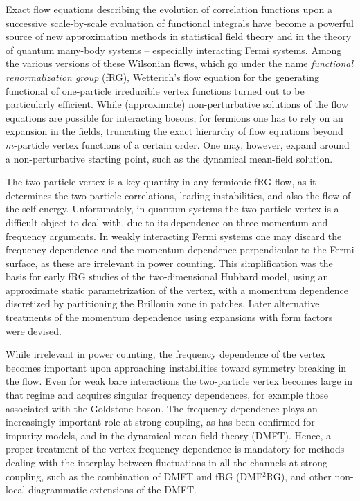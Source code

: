 Exact flow equations describing the evolution of correlation functions upon a successive scale-by-scale evaluation of functional integrals have become a powerful source of new approximation methods in statistical field theory \cite{Berges2002} and in the theory of quantum many-body systems -- especially interacting Fermi systems. \cite{Metzner2012} Among the various versions of these Wilsonian flows, which go under the name {\em functional renormalization group} (fRG), Wetterich's \cite{Wetterich1993} flow equation for the generating functional of one-particle irreducible vertex functions turned out to be particularly efficient. 
While (approximate) non-perturbative solutions of the flow equations are possible for interacting bosons, for fermions one has to rely on an expansion in the fields, truncating the exact hierarchy of flow equations beyond $m$-particle vertex functions of a certain order. One may, however, expand around a non-perturbative starting point, such as the dynamical mean-field solution. \cite{Taranto2014}

The two-particle vertex is a key quantity in any fermionic fRG flow, as it determines the two-particle correlations, leading instabilities, and also the flow of the self-energy. Unfortunately, in quantum systems the two-particle vertex is a difficult object to deal with, due to its dependence on three momentum and frequency arguments. In weakly interacting Fermi systems one may discard the frequency dependence and the momentum dependence perpendicular to the Fermi surface, as these are irrelevant in power counting. This simplification was the basis for early fRG studies of the two-dimensional Hubbard model, using an approximate static parametrization of the vertex, with a momentum dependence discretized by partitioning the Brillouin zone in patches. \cite{Zanchi1996,Halboth2000,Halboth2000b,Honerkamp2001}
Later alternative treatments of the momentum dependence using expansions with form factors were devised.\cite{Husemann2009,Eberlein2013,Eberlein2016}

While irrelevant in power counting, the frequency dependence of the vertex becomes important upon approaching instabilities toward symmetry breaking in the flow.\cite{Husemann2012} Even for weak bare interactions the two-particle vertex becomes large in that regime and acquires singular frequency dependences, for example those associated with the Goldstone boson.\cite{Eberlein2013}
The frequency dependence plays an increasingly important role at strong coupling, as has been confirmed for impurity models,\cite{Kinza2013,Wentzell2016} and in the dynamical mean field theory (DMFT).\cite{Georges1996,Rohringer2012}
Hence, a proper treatment of the vertex frequency-dependence is mandatory for methods dealing with the interplay between fluctuations in all the channels at strong coupling, such as the combination of DMFT and fRG (DMF$^2$RG), \cite{Taranto2014} and other non-local diagrammatic extensions of the DMFT.\cite{Rohringer2017}

